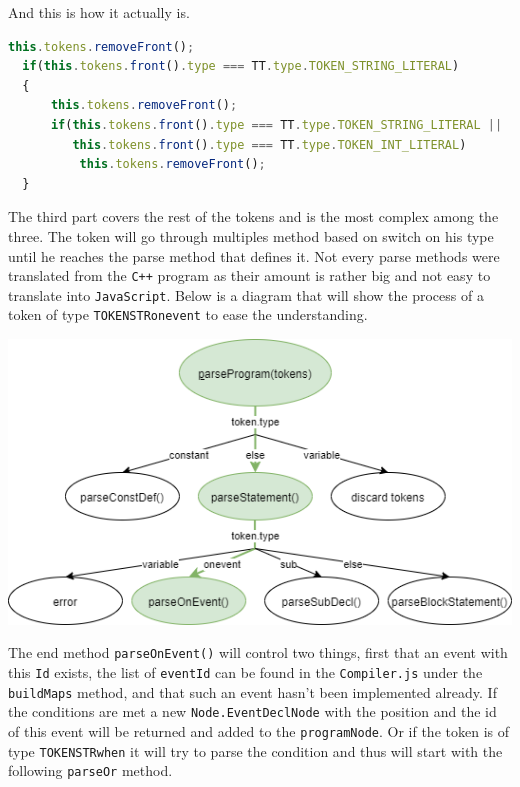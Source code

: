 \documentclass{scrbook}
\begin{document}
And this is how it actually is.

\begin{lstlisting}[language=JavaScript, gobble=2, basicstyle=\ttfamily\small]
  this.tokens.removeFront();
  if(this.tokens.front().type === TT.type.TOKEN_STRING_LITERAL)
  {
      this.tokens.removeFront();
      if(this.tokens.front().type === TT.type.TOKEN_STRING_LITERAL ||
         this.tokens.front().type === TT.type.TOKEN_INT_LITERAL)
          this.tokens.removeFront();
  }
\end{lstlisting}

The third part covers the rest of the tokens and is the most complex among the three. The token will go through multiples method based on switch on his type until he reaches the parse method that defines it. 
Not every parse methods were translated from the \texttt{C++} program as their amount is rather big and not easy to translate into \texttt{JavaScript}. Below is a diagram that will show the process of a token of type \texttt{TOKEN\textunderscore STR\textunderscore onevent} to ease the understanding.

\begin{center}
  \includegraphics[width=\textwidth]{./event_when}
\end{center}

The end method \texttt{parseOnEvent()} will control two things, first that an event with this \texttt{Id} exists, the list of \texttt{eventId} can be found in the \texttt{Compiler.js} under the \texttt{buildMaps} method, and that such an event hasn’t been implemented already. 
If the conditions are met a new \texttt{Node.EventDeclNode} with the position and the id of this event will be returned and added to the \texttt{programNode}. 
Or if the token is of type \texttt{TOKEN\textunderscore STR\textunderscore when} it will try to parse the condition and thus will start with the following \texttt{parseOr} method.
\end{document}

